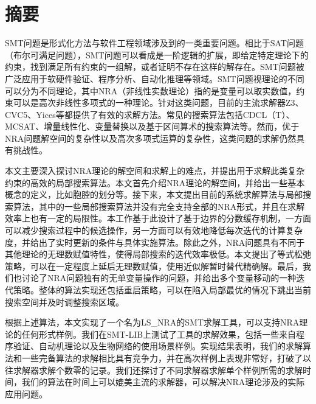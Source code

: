 \maketitle%
\MAKETITLE%
\makedeclaration%
\intobmk\chapter*{摘\quad 要}%
\setcounter{page}{1}%

SMT问题是形式化方法与软件工程领域涉及到的一类重要问题。相比于SAT问题（布尔可满足问题），SMT问题可以看成是一阶逻辑的扩展，即给定特定理论下的约束，找到满足所有约束的一组解，或者证明不存在这样的解存在。SMT问题被广泛应用于软硬件验证、程序分析、自动化推理等领域。SMT问题视理论的不同可以分为不同理论，其中NRA（非线性实数理论）指的是变量可以取实数值，约束可以是高次非线性多项式的一种理论。针对这类问题，目前的主流求解器Z3、CVC5、Yices等都提供了有效的求解方法。常见的搜索算法包括CDCL（T）、MCSAT、增量线性化、变量替换以及基于区间算术的搜索算法等。然而，优于NRA问题解空间的复杂性以及高次多项式运算的复杂性，这类问题的求解仍然具有挑战性。

本文主要深入探讨NRA理论的解空间和求解上的难点，并提出用于求解此类复杂约束的高效的局部搜索算法。本文首先介绍NRA理论的解空间，并给出一些基本概念的定义，比如胞腔的划分等。接下来，本文提出目前的系统求解算法与局部搜索算法，其中的一些局部搜索算法并没有完全支持全部的NRA形式，并且在求解效率上也有一定的局限性。本工作基于此设计了基于边界的分数缓存机制，一方面可以减少搜索过程中的候选操作，另一方面可以有效地降低每次迭代的计算复杂度，并给出了实时更新的条件与具体实施算法。除此之外，NRA问题具有不同于其他理论的无理数赋值特性，使得局部搜索的迭代效率极低。本文提出了等式松弛策略，可以在一定程度上延后无理数赋值，使用近似解暂时替代精确解。最后，我们也讨论了NRA问题独有的无单变量操作的问题，并给出多个变量移动的一种迭代策略。整体的算法实现还包括重启策略，可以在陷入局部最优的情况下跳出当前搜索空间并及时调整搜索区域。

根据上述算法，本文实现了一个名为LS\_NRA的SMT求解工具，可以支持NRA理论的任何形式样例。我们在SMT-LIB上测试了工具的求解效果，包括一些来自程序验证、自动机理论以及生物网络的使用场景样例。实现结果表明，我们的求解算法和一些完备算法的求解相比具有竞争力，并在高次样例上表现非常好，打破了以往求解器求解个数零的记录。我们还探讨了不同求解器求解单个样例所需的求解时间，我们的算法在时间上可以媲美主流的求解器，可以解决NRA理论涉及的实际应用问题。


